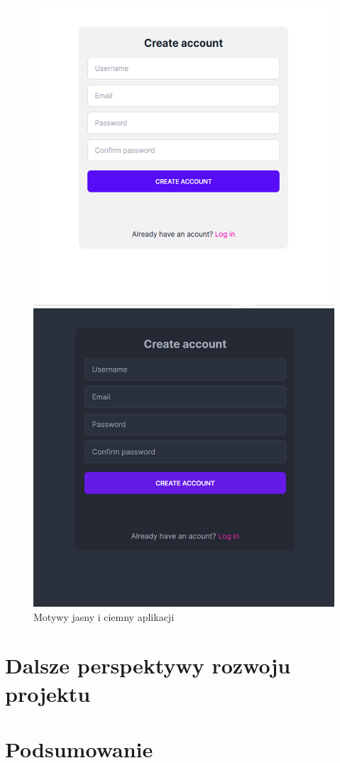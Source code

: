 \begin{figure}[h!]
  \centering
  \begin{minipage}[b]{0.45\textwidth}
    \centering
    \includegraphics[width=\textwidth]{img/widoki/light.png}
  \end{minipage}%
  \hspace*{0.5cm}
  \begin{minipage}[b]{0.45\textwidth}
    \centering
    \includegraphics[width=\textwidth]{img/widoki/dark.png}
  \end{minipage}
  \caption{Motywy jasny i ciemny aplikacji}
  \label{fig:themes_ui}
\end{figure}

\FloatBarrier

\section{Dalsze perspektywy rozwoju projektu}

\section{Podsumowanie}


